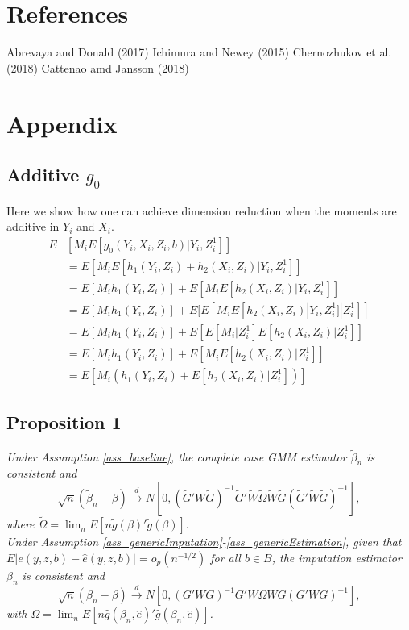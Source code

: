 \documentclass{article}
\theoremstyle{definition}
\theoremstyle{remark}
\begin{document}
\section{References}

Abrevaya and Donald (2017)
Ichimura and Newey (2015)
Chernozhukov et al. (2018)
Cattenao amd Jansson (2018)

\section{Appendix}
\subsection{Additive $g_0$}
Here we show how one can achieve dimension reduction when the moments are additive in $Y_i$ and $X_i$.
\begin{align}
E&[M_i E[g_0(Y_i,X_i,Z_i,b)|Y_i,Z_i^1]] \\
&= E[M_iE[h_1(Y_i,Z_i)+h_2(X_i,Z_i)|Y_i,Z_i^1]] \nonumber \\
&= E[M_i h_1(Y_i,Z_i)] +E[M_i E[h_2(X_i,Z_i)|Y_i, Z_i^1]] \nonumber \\
&=E[M_i h_1(Y_i,Z_i)] +E[E[M_i E[h_2(X_i,Z_i)|Y_i, Z_i^1]|Z_i^1]] \nonumber \\
&=E[M_i h_1(Y_i,Z_i)] +E[E[M_i|Z_i^1] E[h_2(X_i,Z_i)|Z_i^1]] \nonumber \\
&= E[M_i h_1(Y_i,Z_i)] +E[M_i E[h_2(X_i,Z_i)|Z^1_i]] \nonumber \\
&= E\left[M_i (h_1(Y_i,Z_i) + E[h_2(X_i,Z_i)|Z^1_i])\right] \nonumber
\end{align}
\subsection{Proposition 1}

\textit{Under Assumption \ref{ass_baseline}, the complete case GMM estimator $\tilde{\beta}_n$ is consistent and
\[\sqrt{n}(\tilde{\beta}_n-\beta) \stackrel{d}{\rightarrow} N[0, (\tilde{G}'W\tilde{G})^{-1}\tilde{G}'\tilde{W} \tilde{\Omega} \tilde{W} \tilde{G} (\tilde{G}'\tilde{W}\tilde{G})^{-1}],
\]	
where $\tilde{\Omega} = \lim_n E[n\tilde{g}(\beta)'\tilde{g}(\beta)].$ \\
	Under Assumption \ref{ass_genericImputation}-\ref{ass_genericEstimation}, given that $E|e(y, z,b)-\hat{e}(y,z,b)|=o_p(n^{-1/2})$ for all $b \in B$, the imputation estimator $\beta_n$ is consistent and
\[\sqrt{n}(\beta_n-\beta) \stackrel{d}{\rightarrow} N[0, (G'WG)^{-1}G'W \Omega W G (G'WG)^{-1}],
\]
with $\Omega= \lim_n E[n\hat{g}(\beta_n, \hat{e})'\hat{g}(\beta_n, \hat{e})]$.}
\end{document}
